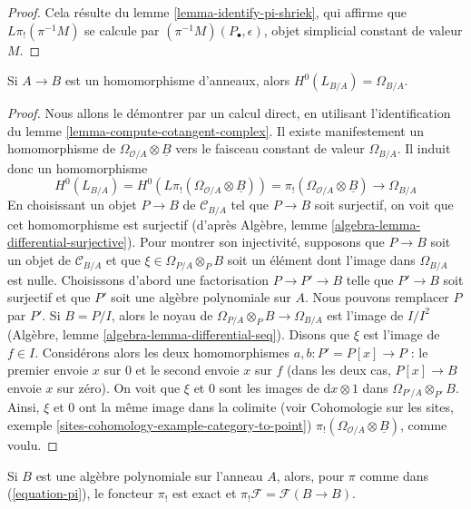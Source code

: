 \begin{proof}
Cela résulte du lemme \ref{lemma-identify-pi-shriek}, qui affirme que
$L\pi_!(\pi^{-1}M)$ se calcule par $(\pi^{-1}M)(P_\bullet, \epsilon)$, objet
simplicial constant de valeur $M$.
\end{proof}

\begin{lemma}
\label{lemma-identify-H0}
Si $A \to B$ est un homomorphisme d'anneaux, alors
$H^0(L_{B/A}) = \Omega_{B/A}$.
\end{lemma}

\begin{proof}
Nous allons le démontrer par un calcul direct, en utilisant l'identification
du lemme \ref{lemma-compute-cotangent-complex}. Il existe manifestement un
homomorphisme de $\Omega_{\mathcal{O}/A} \otimes \underline{B}$ vers le
faisceau constant de valeur $\Omega_{B/A}$. Il induit donc un homomorphisme
$$
H^0(L_{B/A}) = H^0(L\pi_!(\Omega_{\mathcal{O}/A} \otimes \underline{B}))
= \pi_!(\Omega_{\mathcal{O}/A} \otimes \underline{B}) \to \Omega_{B/A}
$$
En choisissant un objet $P \to B$ de $\mathcal{C}_{B/A}$ tel que $P \to B$
soit surjectif, on voit que cet homomorphisme est surjectif (d'après Algèbre,
lemme \ref{algebra-lemma-differential-surjective}). Pour montrer son
injectivité, supposons que $P \to B$ soit un objet de $\mathcal{C}_{B/A}$ et
que $\xi \in \Omega_{P/A} \otimes_P B$ soit un élément dont l'image dans
$\Omega_{B/A}$ est nulle. Choisissons d'abord une factorisation
$P \to P' \to B$ telle que $P' \to B$ soit surjectif et que $P'$ soit une
algèbre polynomiale sur $A$. Nous pouvons remplacer $P$ par $P'$. Si
$B = P/I$, alors le noyau de
$\Omega_{P/A} \otimes_P B \to \Omega_{B/A}$ est l'image de $I/I^2$ (Algèbre,
lemme \ref{algebra-lemma-differential-seq}). Disons que $\xi$ est l'image de
$f \in I$. Considérons alors les deux homomorphismes
$a, b : P' = P[x] \to P$ : le premier envoie $x$ sur $0$ et le second envoie
$x$ sur $f$ (dans les deux cas, $P[x] \to B$ envoie $x$ sur zéro). On voit que
$\xi$ et $0$ sont les images de $\text{d}x \otimes 1$ dans
$\Omega_{P'/A} \otimes_{P'} B$. Ainsi, $\xi$ et $0$ ont la même image dans la
colimite (voir Cohomologie sur les sites, exemple
\ref{sites-cohomology-example-category-to-point})
$\pi_!(\Omega_{\mathcal{O}/A} \otimes \underline{B})$, comme voulu.
\end{proof}

\begin{lemma}
\label{lemma-pi-lower-shriek-polynomial-algebra}
Si $B$ est une algèbre polynomiale sur l'anneau $A$, alors, pour $\pi$ comme
dans (\ref{equation-pi}), le foncteur $\pi_!$ est exact et
$\pi_!\mathcal{F} = \mathcal{F}(B \to B)$.
\end{lemma}

